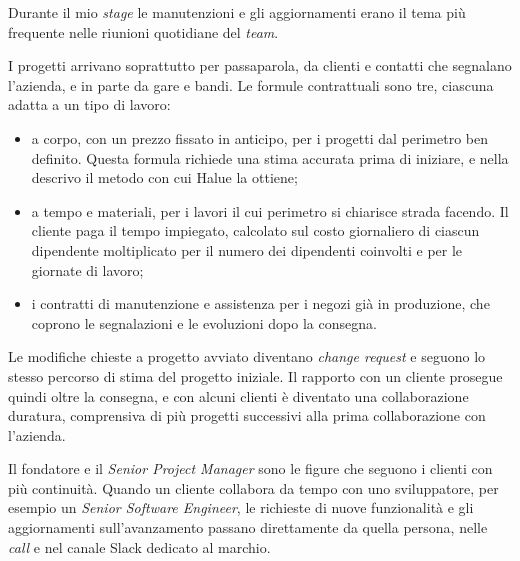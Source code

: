 Durante il mio \emph{stage} le manutenzioni e gli aggiornamenti erano il tema più frequente nelle
riunioni quotidiane del \emph{team}.

I progetti arrivano soprattutto per passaparola, da clienti e contatti che segnalano l’azienda, e
in parte da gare e bandi. Le formule contrattuali sono tre, ciascuna adatta a un tipo di lavoro:

\begin{itemize}
	\item a corpo, con un prezzo fissato in anticipo, per i progetti dal perimetro ben definito.
	Questa formula richiede una stima accurata prima di iniziare, e nella
	 descrivo il metodo con cui Halue la ottiene;
	\item a tempo e materiali, per i lavori il cui perimetro si chiarisce strada facendo. Il
	cliente paga il tempo impiegato, calcolato sul costo giornaliero di ciascun dipendente
	moltiplicato per il numero dei dipendenti coinvolti e per le giornate di lavoro;
	\item i contratti di manutenzione e assistenza per i negozi già in produzione, che coprono le
	segnalazioni e le evoluzioni dopo la consegna.
\end{itemize}

Le modifiche chieste a progetto avviato diventano \emph{change request} e seguono lo stesso
percorso di stima del progetto iniziale. Il rapporto con un cliente prosegue quindi oltre la
consegna, e con alcuni clienti è diventato una collaborazione duratura, comprensiva di più progetti
successivi alla prima collaborazione con l’azienda.

Il fondatore e il \emph{Senior Project Manager} sono le figure che seguono i clienti con più
continuità. Quando un cliente collabora da tempo con uno sviluppatore, per esempio un \emph{Senior
Software Engineer}, le richieste di nuove funzionalità e gli aggiornamenti sull’avanzamento passano
direttamente da quella persona, nelle \emph{call} e nel canale Slack dedicato al marchio.
